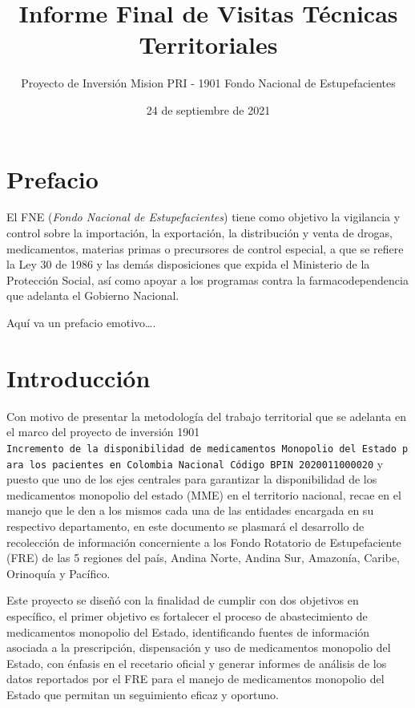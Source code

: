 \documentclass[
]{book}
\title{Informe Final de Visitas Técnicas Territoriales}
\author{Proyecto de Inversión Mision PRI - 1901 Fondo Nacional de Estupefacientes}
\date{24 de septiembre de 2021}
\begin{document}
\maketitle

\renewcommand*\contentsname{Tabla de Contenidos}
{
\setcounter{tocdepth}{2}
\tableofcontents
}
\hypertarget{prefacio}{%
\chapter*{Prefacio}\label{prefacio}}

El FNE (\emph{Fondo Nacional de Estupefacientes}) tiene como objetivo la vigilancia y control sobre la importación, la exportación, la distribución y venta de drogas, medicamentos, materias primas o precursores de control especial, a que se refiere la Ley 30 de 1986 y las demás disposiciones que expida el Ministerio de la Protección Social, así como apoyar a los programas contra la farmacodependencia que adelanta el Gobierno Nacional.

Aquí va un prefacio emotivo\ldots.

\hypertarget{introducciuxf3n}{%
\chapter{Introducción}\label{introducciuxf3n}}

Con motivo de presentar la metodología del trabajo territorial que se adelanta en el marco del proyecto de inversión 1901 \texttt{Incremento\ de\ la\ disponibilidad\ de\ medicamentos\ Monopolio\ del\ Estado\ para\ los\ pacientes\ en\ Colombia\ Nacional\ Código\ BPIN\ 2020011000020} y puesto que uno de los ejes centrales para garantizar la disponibilidad de los medicamentos monopolio del estado (MME) en el territorio nacional, recae en el manejo que le den a los mismos cada una de las entidades encargada en su respectivo departamento, en este documento se plasmará el desarrollo de recolección de información concerniente a los Fondo Rotatorio de Estupefaciente (FRE) de las 5 regiones del país, Andina Norte, Andina Sur, Amazonía, Caribe, Orinoquía y Pacífico.

Este proyecto se diseñó con la finalidad de cumplir con dos objetivos en específico, el primer objetivo es fortalecer el proceso de abastecimiento de medicamentos monopolio del Estado, identificando fuentes de información asociada a la prescripción, dispensación y uso de medicamentos monopolio del Estado, con énfasis en el recetario oficial y generar informes de análisis de los datos reportados por el FRE para el manejo de medicamentos monopolio del Estado que permitan un seguimiento eficaz y oportuno.
\end{document}
